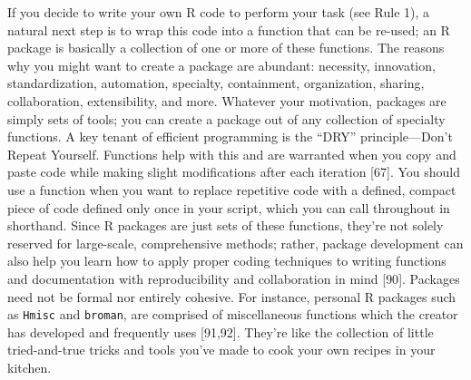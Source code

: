 \documentclass[10pt,letterpaper]{article}
\begin{document}
If you decide to write your own R code to perform your task (see Rule
1), a natural next step is to wrap this code into a function that can be
re-used; an R package is basically a collection of one or more of these
functions. The reasons why you might want to create a package are
abundant: necessity, innovation, standardization, automation, specialty,
containment, organization, sharing, collaboration, extensibility, and
more. Whatever your motivation, packages are simply sets of tools; you
can create a package out of any collection of specialty functions. A key
tenant of efficient programming is the ``DRY'' principle---Don't Repeat
Yourself. Functions help with this and are warranted when you copy and
paste code while making slight modifications after each iteration
{[}67{]}. You should use a function when you want to replace repetitive
code with a defined, compact piece of code defined only once in your
script, which you can call throughout in shorthand. Since R packages are
just sets of these functions, they're not solely reserved for
large-scale, comprehensive methods; rather, package development can also
help you learn how to apply proper coding techniques to writing
functions and documentation with reproducibility and collaboration in
mind {[}90{]}. Packages need not be formal nor entirely cohesive. For
instance, personal R packages such as \texttt{Hmisc} and
\texttt{broman}, are comprised of miscellaneous functions which the
creator has developed and frequently uses {[}91,92{]}. They're like the
collection of little tried-and-true tricks and tools you've made to cook
your own recipes in your kitchen.
\end{document}
